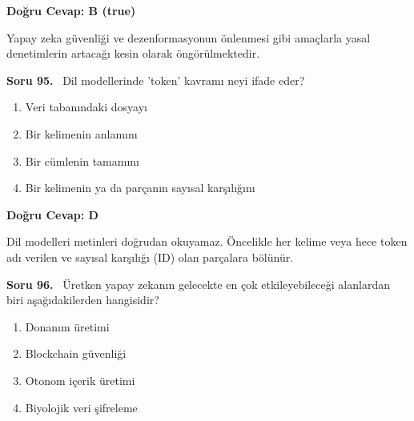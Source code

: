 \documentclass[11pt,a4paper,openany]{book}
\begin{document}
\vspace{4pt}
\begin{tcolorbox}[title=Cevap ve Açıklama, colback=gray!3!white, colframe=primarycolor!90!black, arc=2mm, fonttitle=\bfseries\sffamily, top=6pt, bottom=6pt]
    \textbf{Doğru Cevap: B (true)}
    
    \vspace{2pt}
    Yapay zeka güvenliği ve dezenformasyonun önlenmesi gibi amaçlarla yasal denetimlerin artacağı kesin olarak öngörülmektedir.
\end{tcolorbox}
\vspace{10pt}
\needspace{5cm}
\vspace{8pt}
\noindent\textbf{\large\sffamily Soru 95.} \ Dil modellerinde 'token' kavramı neyi ifade eder?

\begin{enumerate}[label=\Alph*), leftmargin=25pt, topsep=4pt, itemsep=2pt]
        \item Veri tabanındaki dosyayı
        \item Bir kelimenin anlamını
        \item Bir cümlenin tamamını
        \item Bir kelimenin ya da parçanın sayısal karşılığını
\end{enumerate}

\vspace{4pt}
\begin{tcolorbox}[title=Cevap ve Açıklama, colback=gray!3!white, colframe=primarycolor!90!black, arc=2mm, fonttitle=\bfseries\sffamily, top=6pt, bottom=6pt]
    \textbf{Doğru Cevap: D}
    
    \vspace{2pt}
    Dil modelleri metinleri doğrudan okuyamaz. Öncelikle her kelime veya hece token adı verilen ve sayısal karşılığı (ID) olan parçalara bölünür.
\end{tcolorbox}
\vspace{10pt}
\needspace{5cm}
\vspace{8pt}
\noindent\textbf{\large\sffamily Soru 96.} \ Üretken yapay zekanın gelecekte en çok etkileyebileceği alanlardan biri aşağıdakilerden hangisidir?

\begin{enumerate}[label=\Alph*), leftmargin=25pt, topsep=4pt, itemsep=2pt]
        \item Donanım üretimi
        \item Blockchain güvenliği
        \item Otonom içerik üretimi
        \item Biyolojik veri şifreleme
\end{enumerate}
\end{document}
